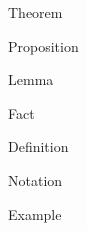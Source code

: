 \documentclass{article}
\begin{document}
\begin{theorem}{}{}
    Theorem
\end{theorem}

\begin{proposition}{}{}
    Proposition
\end{proposition}

\begin{lemma}{}{}
    Lemma
\end{lemma}

\begin{fact}{}{}
    Fact
\end{fact}

\begin{definition}{}{}
    Definition
\end{definition}

\begin{notation}{}{}
    Notation
\end{notation}

\begin{example}{}{}
    Example
\end{example}
\end{document}
